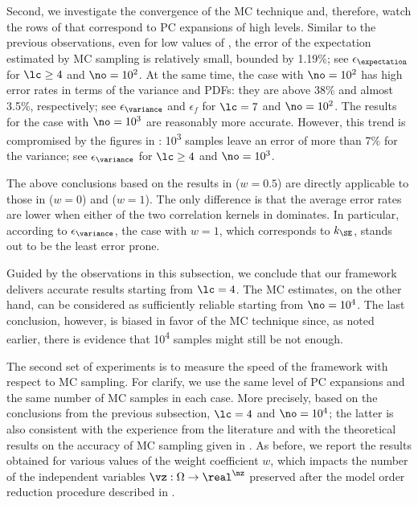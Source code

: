 Second, we investigate the convergence of the \ac{MC} technique and, therefore,
watch the rows of  that correspond to \ac{PC}
expansions of high levels. Similar to the previous observations, even for low
values of \no, the error of the expectation estimated by \ac{MC} sampling is
relatively small, bounded by 1.19\%; see $\epsilon_{\expectation}$ for $\lc
\geq 4$ and $\no = 10^2$. At the same time, the case with $\no = 10^2$ has high
error rates in terms of the variance and \acp{PDF}: they are above 38\% and
almost 3.5\%, respectively; see $\epsilon_{\variance}$ and $\epsilon_f$ for
$\lc = 7$ and $\no = 10^2$. The results for the case with $\no = 10^3$ are
reasonably more accurate. However, this trend is compromised by the figures in
: 10\textsuperscript{3} samples leave an error of more
than 7\% for the variance; see $\epsilon_{\variance}$ for $\lc \geq 4$ and $\no
= 10^3$.

The above conclusions based on the results in  ($w =
0.5$) are directly applicable to those in  ($w = 0$) and
 ($w = 1$). The only difference is that the average
error rates are lower when either of the two correlation kernels in
 dominates. In particular, according to
$\epsilon_{\variance}$, the case with $w = 1$, which corresponds to $k_\SE$,
stands out to be the least error prone.

Guided by the observations in this subsection, we conclude that our framework
delivers accurate results starting from $\lc = 4$. The \ac{MC} estimates, on the
other hand, can be considered as sufficiently reliable starting from $\no =
10^4$. The last conclusion, however, is biased in favor of the \ac{MC} technique
since, as noted earlier, there is evidence that 10\textsuperscript{4} samples
might still be not enough.


The second set of experiments is to measure the speed of the framework with
respect to \ac{MC} sampling. For clarify, we use the same level of \ac{PC}
expansions and the same number of \ac{MC} samples in each case. More precisely,
based on the conclusions from the previous subsection, $\lc = 4$ and $\no =
10^4$; the latter is also consistent with the experience from the literature
\cite{ghanta2006, bhardwaj2008, huang2009a, shen2009, lee2013} and with the
theoretical results on the accuracy of \ac{MC} sampling given in
\cite{diaz-emparanza2002}. As before, we report the results obtained for various
values of the weight coefficient $w$, which impacts the number of the
independent variables $\vz: \Omega \to \real^\nz$ preserved after the model
order reduction procedure described in .

